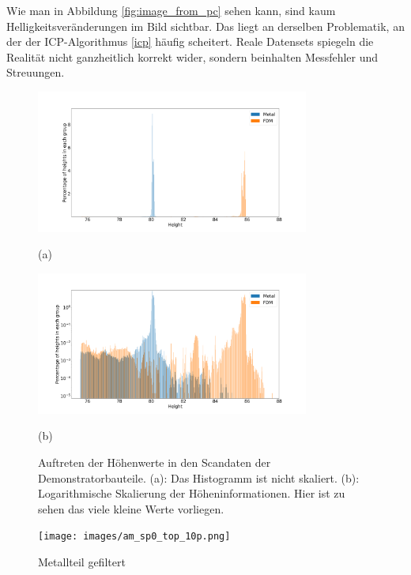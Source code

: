 Wie man in Abbildung \ref{fig:image_from_pc} sehen kann, sind kaum Helligkeitsveränderungen
im Bild sichtbar. Das liegt an derselben Problematik, an der der ICP-Algorithmus \ref{icp} häufig
scheitert. Reale Datensets spiegeln die Realität nicht ganzheitlich korrekt wider, sondern
beinhalten Messfehler und Streuungen.

\begin{figure}[H]
    \centering
    \begin{minipage}{\textwidth}
        \centering
        \includegraphics[width=0.8\textwidth]{images/height_occurange.png} %
        \caption*{(a)}
    \end{minipage}\hfill
    \begin{minipage}{\textwidth}
        \centering
        \includegraphics[width=0.8\textwidth]{images/height_occurange_log.png} %
        \caption*{(b)}
    \end{minipage}
    \caption{Auftreten der Höhenwerte in den Scandaten der Demonstratorbauteile. 
    (a): Das Histogramm ist nicht skaliert. (b): Logarithmische Skalierung der 
    Höheninformationen. Hier ist zu sehen das viele kleine Werte vorliegen.}
    \label{fig:brightness}
\end{figure}


\begin{figure}
    \centering
    \texttt{[image: images/am\_sp0\_top\_10p.png]}
    \caption{Metallteil gefiltert}
    \label{fig:metall_image}
\end{figure}

